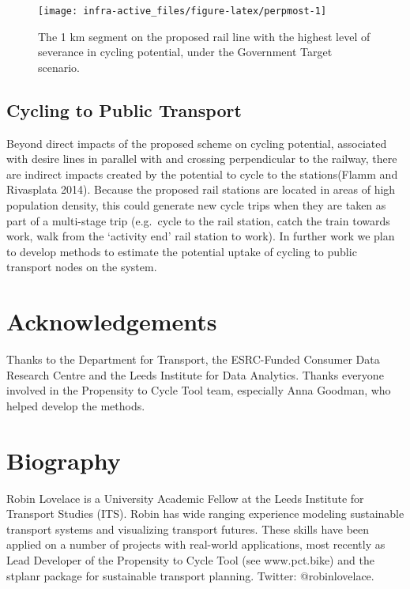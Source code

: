\documentclass[11pt]{article}
\begin{document}
\begin{figure}

{\centering \texttt{[image: infra-active\_files/figure-latex/perpmost-1]}

}

\caption{The 1 km segment on the proposed rail line with the highest level of severance in cycling potential, under the Government Target scenario.}\label{fig:perpmost}
\end{figure}

\subsection{Cycling to Public
Transport}\label{cycling-to-public-transport}

Beyond direct impacts of the proposed scheme on cycling potential,
associated with desire lines in parallel with and crossing perpendicular
to the railway, there are indirect impacts created by the potential to
cycle to the stations(Flamm and Rivasplata 2014).
Because the proposed rail stations are located in
areas of high population density, this could generate new cycle trips
when they are taken as part of a multi-stage trip (e.g.~cycle to the
rail station, catch the train towards work, walk from the `activity end'
rail station to work).
In further work we plan to develop methods to estimate the potential uptake of cycling to public transport nodes on the system.

\section{Acknowledgements}

Thanks to the Department for Transport, the ESRC-Funded Consumer Data Research Centre and the Leeds Institute for Data Analytics.
Thanks everyone involved in the Propensity to Cycle Tool team, especially Anna Goodman, who helped develop the methods.

\section{Biography}

Robin Lovelace is a University Academic Fellow at the Leeds Institute for Transport Studies (ITS). Robin has wide ranging experience modeling sustainable transport systems and visualizing transport futures. These skills have been applied on a number of projects with real-world applications, most recently as Lead Developer of the Propensity to Cycle Tool (see www.pct.bike) and the stplanr package for sustainable transport planning. Twitter: @robinlovelace.
\end{document}
